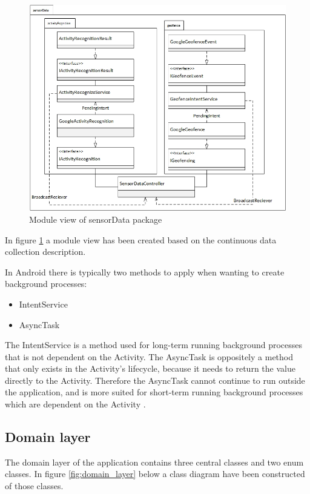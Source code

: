 \begin{figure}[H]
\centering
\includegraphics[scale=0.45]{Graphics/Images/Module_View_SensorData.png}
\caption{Module view of sensorData package}
\label{fig:Module_View_Sensor_Data}
\end{figure}
In figure \ref{fig:Module_View_Sensor_Data} a module view has been created based on the continuous data collection description. 

In Android there is typically two methods to apply when wanting to create background processes:
\begin{itemize}
    \item IntentService
    \item AsyncTask
\end{itemize}

The IntentService is a method used for long-term running background processes that is not dependent on the Activity. The AsyncTask is oppositely a method that only exists in the Activity's lifecycle, because it needs to return the value directly to the Activity. Therefore the AsyncTask cannot continue to run outside the application, and is more suited for short-term running background processes which are dependent on the Activity \cite{backgroundServices}. 

\subsection{Domain layer}

The domain layer of the application contains three central classes and two enum classes. In figure \ref{fig:domain_layer} below a class diagram have been constructed of those classes. 

